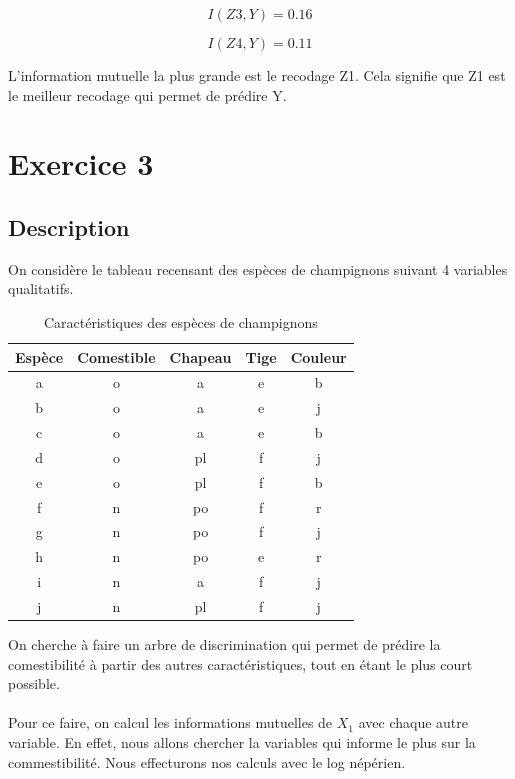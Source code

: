 \documentclass{article}
\begin{document}
\[
I(Z3,Y) = 0.16
\]

\[
I(Z4,Y) = 0.11
\]

L'information mutuelle la plus grande est le recodage Z1.
Cela signifie que Z1 est le meilleur recodage qui permet de prédire Y.


\newpage
\section{Exercice 3}
\subsection{Description}

On considère le tableau recensant des espèces de champignons suivant 4 variables qualitatifs. 

\begin{table}[h]
  \centering
  \caption{Caractéristiques des espèces de champignons}
  \begin{tabular}{@{}ccccc@{}}
  \toprule
  Espèce & Comestible & Chapeau & Tige & Couleur \\ \midrule
  a      & o          & a       & e    & b       \\
  b      & o          & a       & e    & j       \\
  c      & o          & a       & e    & b       \\
  d      & o          & pl      & f    & j       \\
  e      & o          & pl      & f    & b       \\
  f      & n          & po      & f    & r       \\
  g      & n          & po      & f    & j       \\
  h      & n          & po      & e    & r       \\
  i      & n          & a       & f    & j       \\
  j      & n          & pl      & f    & j       \\ \bottomrule
  \end{tabular}
  
  \label{tab:champignons}
  \end{table}

  On cherche à faire un arbre de discrimination qui permet de prédire la comestibilité à partir des autres caractéristiques, tout en étant le plus court possible.
  \\
  \\
  Pour ce faire, on calcul les informations mutuelles de $X_1$ avec chaque autre variable.
  En effet, nous allons chercher la variables qui informe le plus sur la commestibilité. Nous effecturons nos calculs avec le log népérien.
\end{document}
